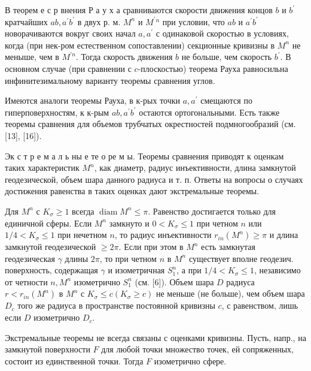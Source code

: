 \documentclass[10pt]{article}
\begin{document}
В теорем е с р внения Р а у х а сравниваются скорости движения концов $b$ и $b^{\prime}$ кратчайших $a b, a^{\prime} b^{\prime}$ в двух р. м. $M^{n}$ и $M^{\prime}{ }^{n}$ при условии, что $a b$ и $a^{\prime} b^{\prime}$ новорачиваются вокруг своих начал $a, a^{\prime}$ с одинаковой скоростью в условиях, когда (при нек-ром естественном сопоставлении) секционные кривизны в $M^{n}$ не меныше, чем в $M^{\prime n}$. Тогда скорость движения $b$ не больше, чем скорость $b^{\prime}$. В основном случае (при сравнении с $c$-плоскостью) теорема Рауха равносильна инфинитезимальному варианту теоремы сравнения углов.



Имеются аналоги теоремы Рауха, в к-рых точки $a, a^{\prime}$ смещаются по гиперповерхностям, к к-рым $a b, a^{\prime} b^{\prime}$ остаются ортогональными. Есть также теоремы сравнения для объемов трубчатых окрестностей подмногообразий (см. [13], [16]).



Эк с т р е м а л ь ны е те о ре м ы. Теоремы сравнения приводят к оценкам таких характеристик $M^{n}$, как диаметр, радиус инъективности, длина замкнутой геодезической, объем шара данного радиуса и т. п. Ответы на вопросы о случаях достижения равенства в таких оценках дают экстремальные теоремы.



Для $M^{n}$ с $K_{\sigma} \geqslant 1$ всегда $\operatorname{diam} M^{n} \leqslant \pi$. Равенство достигается только для единичной сферы. Если $M^{n}$ замкнуто и $0<K_{\sigma} \leqslant 1$ при четном $n$ или $1 / 4<K_{\sigma} \leqslant 1$ при нечетном $n$, то радиус инъективности $r_{i n}\left(M^{n}\right) \geqslant \pi$ и длина замкнутой геодезической $\geqslant 2 \pi$. Если при этом в $M^{n}$ есть замкнутая геодезическая $\gamma$ длины $2 \pi$, то при четном $n$ в $M^{n}$ существует вполне геодезич. поверхность, содержащая $\gamma$ и изометричная $S_{1}^{n}$, а при $1 / 4<K_{\sigma} \leqslant 1$, независимо от четности $n, M^{n}$ изометрично $S_{1}^{n}$ (см. [6]). Объем шара $D$ радиуса $r<r_{i n}\left(M^{n}\right)$ в $M^{n}$ с $K_{\sigma} \leqslant c\left(K_{\sigma} \geqslant c\right)$ не меньше (не больше), чем объем шара $D_{c}$ того же радиуса в пространстве постоянной кривизны $c$, с равенством, лишь если $D$ изометрично $D_{c}$.



Экстремальные теоремы не всегда связаны с оценками кривизны. Пусть, напр., на замкнутой поверхности $F$ для любой точки множество точек, ей сопряженных, состоит из единственной точки. Тогда $F$ изометрично сфере.
\end{document}
